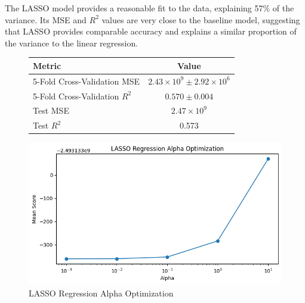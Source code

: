 \documentclass[12pt, letterpaper]{report}
\begin{document}
The LASSO model provides a reasonable fit to the data, explaining 57\% of the variance. Its MSE and $R^2$ values are very close to the baseline model, suggesting that LASSO provides comparable accuracy and explains a similar proportion of the variance to the linear regression. 
\begin{figure}[ht]
  \centering
  \begin{minipage}{0.48\textwidth}
    \centering
    \begin{tabular}{lc}
      \toprule
      Metric & Value \\
      \midrule
      5-Fold Cross-Validation MSE & \(2.43 \times 10^9 \pm 2.92 \times 10^6\) \\
      5-Fold Cross-Validation \(R^2\) & \(0.570 \pm 0.004\) \\
      Test MSE & \(2.47 \times 10^9\) \\
      Test \(R^2\) & 0.573 \\
      \bottomrule
    \end{tabular}
    \label{tab:lasso_performance}
  \end{minipage}\hfill
  \begin{minipage}{0.38\textwidth}
    \centering
    \includegraphics[width=\linewidth]{download-4.png}
    \caption{LASSO Regression Alpha Optimization}
    \label{fig:second_image}
  \end{minipage}
\end{figure}
\end{document}
